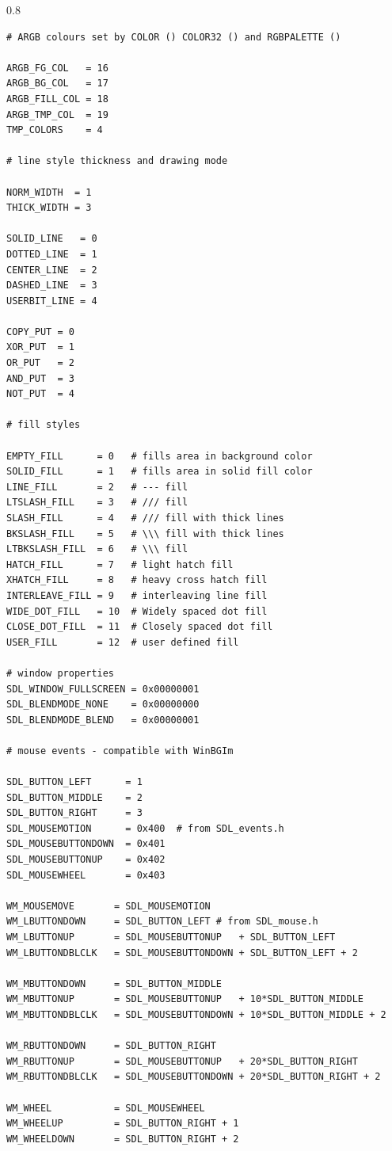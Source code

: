 \documentclass[a4paper,12pt]{article}
\newenvironment{margins}[2]
{ %
\begin{list}{}
{
\setlength{\leftmargin}{#1}
\setlength{\rightmargin}{#2}
} \item
} %
{\end{list}}
\begin{document}
\begin{margins}{-0.5cm}{-0.5cm}
\begin{spacing}{0.8}
\begin{lstlisting}
# ARGB colours set by COLOR () COLOR32 () and RGBPALETTE ()

ARGB_FG_COL   = 16
ARGB_BG_COL   = 17
ARGB_FILL_COL = 18
ARGB_TMP_COL  = 19
TMP_COLORS    = 4

# line style thickness and drawing mode

NORM_WIDTH  = 1
THICK_WIDTH = 3

SOLID_LINE   = 0
DOTTED_LINE  = 1
CENTER_LINE  = 2
DASHED_LINE  = 3
USERBIT_LINE = 4

COPY_PUT = 0
XOR_PUT  = 1
OR_PUT   = 2
AND_PUT  = 3
NOT_PUT  = 4

# fill styles

EMPTY_FILL      = 0   # fills area in background color
SOLID_FILL      = 1   # fills area in solid fill color
LINE_FILL       = 2   # --- fill
LTSLASH_FILL    = 3   # /// fill
SLASH_FILL      = 4   # /// fill with thick lines
BKSLASH_FILL    = 5   # \\\ fill with thick lines
LTBKSLASH_FILL  = 6   # \\\ fill
HATCH_FILL      = 7   # light hatch fill
XHATCH_FILL     = 8   # heavy cross hatch fill
INTERLEAVE_FILL = 9   # interleaving line fill
WIDE_DOT_FILL   = 10  # Widely spaced dot fill
CLOSE_DOT_FILL  = 11  # Closely spaced dot fill
USER_FILL       = 12  # user defined fill

# window properties
SDL_WINDOW_FULLSCREEN = 0x00000001
SDL_BLENDMODE_NONE    = 0x00000000
SDL_BLENDMODE_BLEND   = 0x00000001

# mouse events - compatible with WinBGIm

SDL_BUTTON_LEFT      = 1
SDL_BUTTON_MIDDLE    = 2
SDL_BUTTON_RIGHT     = 3
SDL_MOUSEMOTION      = 0x400  # from SDL_events.h
SDL_MOUSEBUTTONDOWN  = 0x401
SDL_MOUSEBUTTONUP    = 0x402
SDL_MOUSEWHEEL       = 0x403

WM_MOUSEMOVE       = SDL_MOUSEMOTION
WM_LBUTTONDOWN     = SDL_BUTTON_LEFT # from SDL_mouse.h
WM_LBUTTONUP       = SDL_MOUSEBUTTONUP   + SDL_BUTTON_LEFT
WM_LBUTTONDBLCLK   = SDL_MOUSEBUTTONDOWN + SDL_BUTTON_LEFT + 2

WM_MBUTTONDOWN     = SDL_BUTTON_MIDDLE
WM_MBUTTONUP       = SDL_MOUSEBUTTONUP   + 10*SDL_BUTTON_MIDDLE
WM_MBUTTONDBLCLK   = SDL_MOUSEBUTTONDOWN + 10*SDL_BUTTON_MIDDLE + 2

WM_RBUTTONDOWN     = SDL_BUTTON_RIGHT
WM_RBUTTONUP       = SDL_MOUSEBUTTONUP   + 20*SDL_BUTTON_RIGHT
WM_RBUTTONDBLCLK   = SDL_MOUSEBUTTONDOWN + 20*SDL_BUTTON_RIGHT + 2

WM_WHEEL           = SDL_MOUSEWHEEL
WM_WHEELUP         = SDL_BUTTON_RIGHT + 1
WM_WHEELDOWN       = SDL_BUTTON_RIGHT + 2


\end{lstlisting}
\end{spacing}
\end{margins}
\end{document}
